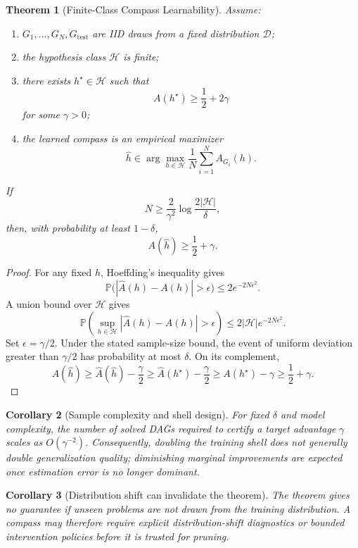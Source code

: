 \documentclass[11pt]{article}
\newtheorem{theorem}{Theorem}[section]
\newtheorem{corollary}[theorem]{Corollary}
\newcommand{\Prob}{\mathbb{P}}
\newcommand{\Hcal}{\mathcal{H}}
\newcommand{\Dcal}{\mathcal{D}}
\begin{document}
\begin{theorem}[Finite-Class Compass Learnability]
Assume:
\begin{enumerate}[label=(L\arabic*)]
\item \(G_1,\ldots,G_N,G_{\mathrm{test}}\) are IID draws from a fixed distribution \(\Dcal\);
\item the hypothesis class \(\Hcal\) is finite;
\item there exists \(h^\star\in\Hcal\) such that
\[
A(h^\star)\ge \frac12+2\gamma
\]
for some \(\gamma>0\);
\item the learned compass is an empirical maximizer
\[
\widehat h\in\arg\max_{h\in\Hcal}\frac1N\sum_{i=1}^N A_{G_i}(h).
\]
\end{enumerate}
If
\[
N\ge \frac{2}{\gamma^2}\log\frac{2|\Hcal|}{\delta},
\]
then, with probability at least \(1-\delta\),
\[
A(\widehat h)\ge \frac12+\gamma.
\]
\end{theorem}

\begin{proof}
For any fixed \(h\), Hoeffding's inequality gives
\[
\Prob\bigl(|\widehat A(h)-A(h)|>\epsilon\bigr)\le 2e^{-2N\epsilon^2}.
\]
A union bound over \(\Hcal\) gives
\[
\Prob\left(\sup_{h\in\Hcal}|\widehat A(h)-A(h)|>\epsilon\right)
\le 2|\Hcal|e^{-2N\epsilon^2}.
\]
Set \(\epsilon=\gamma/2\). Under the stated sample-size bound, the event of uniform deviation greater than \(\gamma/2\) has probability at most \(\delta\). On its complement,
\[
A(\widehat h)
\ge \widehat A(\widehat h)-\frac{\gamma}{2}
\ge \widehat A(h^\star)-\frac{\gamma}{2}
\ge A(h^\star)-\gamma
\ge \frac12+\gamma.
\]
\end{proof}

\begin{corollary}[Sample complexity and shell design]
For fixed \(\delta\) and model complexity, the number of solved DAGs required to certify a target advantage \(\gamma\) scales as \(O(\gamma^{-2})\). Consequently, doubling the training shell does not generally double generalization quality; diminishing marginal improvements are expected once estimation error is no longer dominant.
\end{corollary}

\begin{corollary}[Distribution shift can invalidate the theorem]
The theorem gives no guarantee if unseen problems are not drawn from the training distribution. A compass may therefore require explicit distribution-shift diagnostics or bounded intervention policies before it is trusted for pruning.
\end{corollary}
\end{document}
